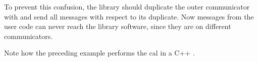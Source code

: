 To prevent this confusion, the library should duplicate the outer
communicator with 
%
and send all messages with respect to its duplicate. Now messages from the user
code can never reach the library software, since they are on different communicators.


Note how the preceding example
performs the 
cal in a C++ .


